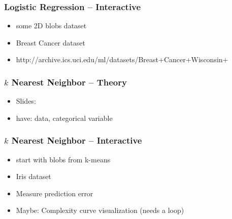 \begin{frame}
    \frametitle{Logistic Regression -- Interactive}
    \begin{itemize}
        \item some 2D blobs dataset
        \item  Breast Cancer dataset
        \item  http://archive.ics.uci.edu/ml/datasets/Breast+Cancer+Wisconsin+%
    \end{itemize}
\end{frame}

\begin{frame}
    \frametitle{$k$ Nearest Neighbor -- Theory}
    \begin{itemize}
        \item Slides:
        \item  have: data, categorical variable
    \end{itemize}
\end{frame}

\begin{frame}
    \frametitle{$k$ Nearest Neighbor -- Interactive}
    \begin{itemize}
        \item  start with blobs from k-means
        \item  Iris dataset
        \item  Measure prediction error
        \item  Maybe: Complexity curve visualization (needs a loop)
    \end{itemize}
\end{frame}

